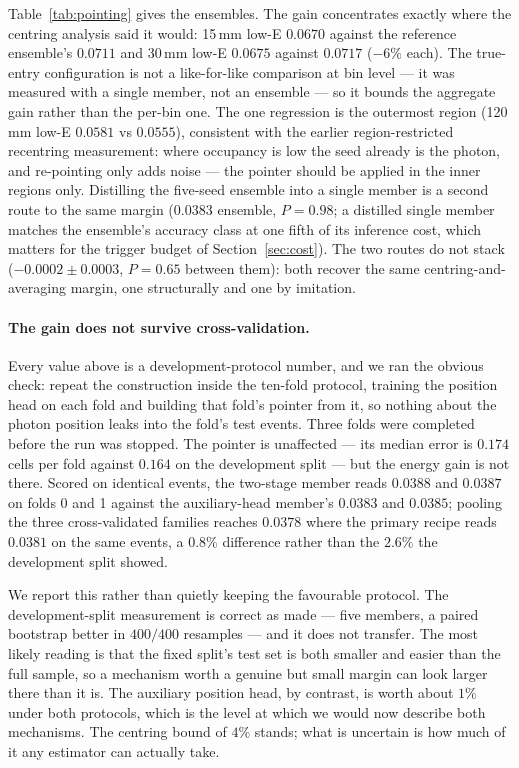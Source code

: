 \documentclass[11pt,a4paper]{article}
\begin{document}
Table~\ref{tab:pointing} gives the ensembles. The gain concentrates
exactly where the centring analysis said it would: 15\,mm low-E
$0.0670$ against the reference ensemble's $0.0711$ and 30\,mm low-E $0.0675$
against $0.0717$ ($-6\%$ each). The true-entry configuration is not a
like-for-like comparison at bin level --- it was measured with a single
member, not an ensemble --- so it bounds the aggregate gain rather than the
per-bin one. The one regression is the outermost region (120\,mm low-E
$0.0581$ vs $0.0555$), consistent with the earlier region-restricted
recentring measurement: where occupancy is low the seed already is the
photon, and re-pointing only adds noise --- the pointer should be applied
in the inner regions only. Distilling the five-seed ensemble into a
single member is a second route to the same margin ($0.0383$ ensemble,
$P{=}0.98$; a distilled single member matches the ensemble's accuracy
class at one fifth of its inference cost, which matters for the trigger
budget of Section~\ref{sec:cost}). The two routes do not stack
($-0.0002 \pm 0.0003$, $P{=}0.65$ between them): both recover the same
centring-and-averaging margin, one structurally and one by imitation.

\paragraph{The gain does not survive cross-validation.} Every value above
is a development-protocol number, and we ran the obvious check: repeat the
construction inside the ten-fold protocol, training the position head on
each fold and building that fold's pointer from it, so nothing about the
photon position leaks into the fold's test events. Three folds were
completed before the run was stopped. The pointer is unaffected --- its
median error is $0.174$ cells per fold against $0.164$ on the development
split --- but the energy gain is not there. Scored on identical events, the
two-stage member reads $0.0388$ and $0.0387$ on folds 0 and 1 against the
auxiliary-head member's $0.0383$ and $0.0385$; pooling the three
cross-validated families reaches $0.0378$ where the primary recipe reads
$0.0381$ on the same events, a $0.8\%$ difference rather than the $2.6\%$
the development split showed.

We report this rather than quietly keeping the favourable protocol. The
development-split measurement is correct as made --- five members, a paired
bootstrap better in $400/400$ resamples --- and it does not transfer. The
most likely reading is that the fixed split's test set is both smaller and
easier than the full sample, so a mechanism worth a genuine but small
margin can look larger there than it is. The auxiliary position head, by
contrast, is worth about $1\%$ under both protocols, which is the level at
which we would now describe both mechanisms. The centring bound of $4\%$
stands; what is uncertain is how much of it any estimator can actually
take.
\end{document}
